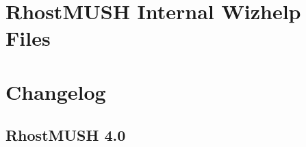 \documentclass[letterpaper,10pt,english]{sphinxmanual}
\begin{document}
\chapter{RhostMUSH Internal Wizhelp Files}
\label{\detokenize{wizhelpfile:rhostmush-internal-wizhelp-files}}\label{\detokenize{wizhelpfile::doc}}



\chapter{Changelog}
\label{\detokenize{changelog:changelog}}\label{\detokenize{changelog:id1}}\label{\detokenize{changelog::doc}}

\section{RhostMUSH 4.0}
\end{document}
